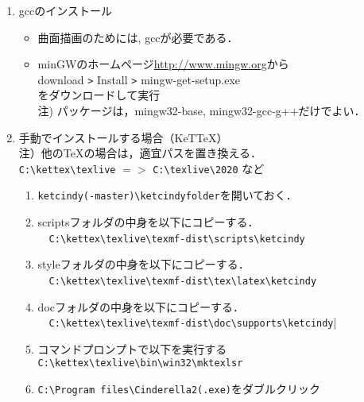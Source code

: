\documentclass{ujarticle}
\begin{document}
\begin{enumerate}[\bf\large 1.]
\item gccのインストール
  \begin{itemize}
    \item 曲面描画のためには, gccが必要である．
    \item minGWのホームページ\url{http://www.mingw.org}から\\
    \hspace*{10mm}download \verb|>| Install \verb|>| mingw-get-setup.exe\\
    をダウンロードして実行\\
    \hspace*{10mm}注) パッケージは，mingw32-base, mingw32-gcc-g++だけでよい．
  \end{itemize}

\item 手動でインストールする場合（KeTTeX）\\
\hspace*{1zw}注）他のTeXの場合は，適宜パスを置き換える．\\
\hspace*{3zw}\verb|C:\kettex\texlive| $=>$ \verb|C:\texlive\2020| など
  \begin{enumerate}[(1)]
  \item \verb|ketcindy(-master)\ketcindyfolder|を開いておく．
  \item scriptsフォルダの中身を以下にコピーする．\\
　\verb|C:\kettex\texlive\texmf-dist\scripts\ketcindy|
  \item styleフォルダの中身を以下にコピーする．\\
　\verb|C:\kettex\texlive\texmf-dist\tex\latex\ketcindy|
  \item docフォルダの中身を以下にコピーする．\\
　\verb|C:\kettex\texlive\texmf-dist\doc\supports\ketcindy||
  \item コマンドプロンプトで以下を実行する\\
  \hspace*{1zw}\verb|C:\kettex\texlive\bin\win32\mktexlsr|
  \item \verb|C:\Program files\Cinderella2(.exe)|をダブルクリック
  \end{enumerate}
\end{enumerate}
\end{document}
